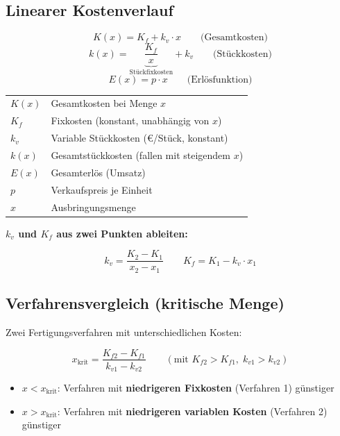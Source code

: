 \documentclass[10pt,a4paper]{article}
\begin{document}
\begin{multicols}{2}

\subsection{Linearer Kostenverlauf}

\begin{formelbox}
\[
K(x) = K_f + k_v \cdot x \qquad \text{(Gesamtkosten)}
\]
\[
k(x) = \underbrace{\frac{K_f}{x}}_{\text{Stückfixkosten}} + k_v \qquad \text{(Stückkosten)}
\]
\[
E(x) = p \cdot x \qquad \text{(Erlösfunktion)}
\]
\end{formelbox}

\begin{tabular}{|L{1.8cm}|L{5.2cm}|}
\hline
{}
$K(x)$ & Gesamtkosten bei Menge $x$ \\
$K_f$ & Fixkosten (konstant, unabhängig von $x$) \\
$k_v$ & Variable Stückkosten (€/Stück, konstant) \\
$k(x)$ & Gesamtstückkosten (fallen mit steigendem $x$) \\
$E(x)$ & Gesamterlös (Umsatz) \\
$p$ & Verkaufspreis je Einheit \\
$x$ & Ausbringungsmenge \\
\hline
\end{tabular}

\vspace{4pt}
\textbf{$k_v$ und $K_f$ aus zwei Punkten ableiten:}
\begin{formelbox}
\[
k_v = \frac{K_2 - K_1}{x_2 - x_1}
\qquad
K_f = K_1 - k_v \cdot x_1
\]
\end{formelbox}

\subsection{Verfahrensvergleich (kritische Menge)}

Zwei Fertigungsverfahren mit unterschiedlichen Kosten:

\begin{formelbox}
\[
x_{\text{krit}} = \frac{K_{f2} - K_{f1}}{k_{v1} - k_{v2}}
\qquad (\text{mit } K_{f2} > K_{f1},\; k_{v1} > k_{v2})
\]
\end{formelbox}

\begin{itemize}[noitemsep, leftmargin=*]
  \item $x < x_{\text{krit}}$: Verfahren mit \textbf{niedrigeren Fixkosten} (Verfahren 1) günstiger
  \item $x > x_{\text{krit}}$: Verfahren mit \textbf{niedrigeren variablen Kosten} (Verfahren 2) günstiger
\end{itemize}


\end{multicols}
\end{document}
